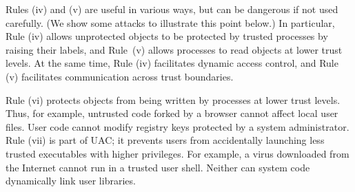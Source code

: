 \documentclass{sigplanconf}
\begin{document}
Rules (iv) and (v) are useful in various ways, but can be dangerous if not used carefully. (We show some attacks to illustrate this point below.) In particular, Rule (iv) allows unprotected objects to be protected by trusted processes by raising
their labels, and Rule~(v) allows processes to read objects at lower trust levels. At the same time, Rule (iv) facilitates dynamic access
control, and Rule (v) facilitates communication across trust boundaries. 

Rule (vi) protects objects from being written by processes at lower trust levels. Thus, for example, untrusted code
forked by a browser cannot affect local user files. User code cannot modify registry keys protected by a system administrator. 
Rule (vii) is part of UAC; it 
prevents users from accidentally launching less trusted executables with higher privileges. For example, a virus downloaded from the Internet cannot run
in a trusted user shell. Neither can system code dynamically link
user libraries.
\end{document}
